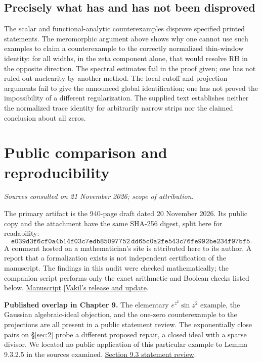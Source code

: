 \documentclass[11pt,reqno]{amsart}
\numberwithin{equation}{section}
\begin{document}
\subsection*{Precisely what has and has not been disproved}
The scalar and functional-analytic counterexamples disprove specified printed statements. The meromorphic argument above shows why one cannot use such examples to claim a counterexample to the correctly normalized thin-window identity: for all widths, in the zeta component alone, that would resolve RH in the opposite direction. The spectral estimates fail in the proof given; one has not ruled out nuclearity by another method. The local cutoff and projection arguments fail to give the announced global identification; one has not proved the impossibility of a different regularization. The supplied text establishes neither the normalized trace identity for arbitrarily narrow strips nor the claimed conclusion about all zeros.


\section{Public comparison and reproducibility}\label{sec:13}

\textit{Sources consulted on 21 November 2026; scope of attribution.}\par
The primary artifact is the 940-page draft dated 20 November 2026. Its public copy and the attachment have the same SHA-256 digest, split here for readability:
\[
\texttt{e039d3f6cf0a4b14f03c7edb85097752}\,
\texttt{dd65c0a2fe543c76fe992be234f97bf5}.
\]
A comment hosted on a mathematician's site is attributed here to its author. A report that a formalization exists is not independent certification of the manuscript. The findings in this audit were checked mathematically; the companion script performs only the exact arithmetic and Boolean checks listed below. \href{https://math216.wordpress.com/wp-content/uploads/2026/11/the-music-of-the-primes.pdf}{Manuscript} \enspace|\enspace \href{https://math216.wordpress.com/2026/11/20/hurried-announcement-alessandro-masullo-grh/}{Vakil's release and update}.

\textbf{Published overlap in Chapter 9.} The elementary \(e^{z^2}\sin z^2\) example, the Gaussian algebraic-ideal objection, and the one-zero counterexample to the projections are all present in a public statement review. The exponentially close pairs on \S\ref{sec:2} probe a different proposed repair, a closed ideal with a sparse divisor. We located no public application of this particular example to Lemma 9.3.2.5 in the sources examined. \href{https://github.com/mccorvie/riemann-masullo/pull/2437\#issuecomment-7057600557}{Section 9.3 statement review}.
\end{document}
